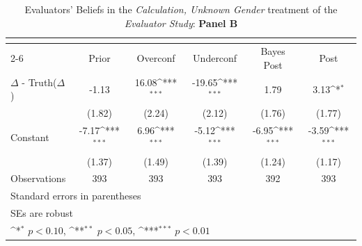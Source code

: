 \begin{table}[htbp]\centering
\def\sym#1{\ifmmode^{#1}\else\(^{#1}\)\fi}
\caption{Evaluators' Beliefs in the \textit{Calculation, Unknown Gender} treatment of the \textit{Evaluator Study}: \textbf{Panel B}}
\begin{tabular}{l*{5}{c}}
\hline\hline
                &\multicolumn{5}{c}{}                                                                          \\\cmidrule(lr){2-6}
                &\multicolumn{1}{c}{Prior}&\multicolumn{1}{c}{Overconf}&\multicolumn{1}{c}{Underconf}&\multicolumn{1}{c}{Bayes Post}&\multicolumn{1}{c}{Post}\\
\hline
$\Delta$ - Truth($\Delta$)&    -1.13         &    16.08\sym{***}&   -19.65\sym{***}&     1.79         &     3.13\sym{*}  \\
                &   (1.82)         &   (2.24)         &   (2.12)         &   (1.76)         &   (1.77)         \\
Constant        &    -7.17\sym{***}&     6.96\sym{***}&    -5.12\sym{***}&    -6.95\sym{***}&    -3.59\sym{***}\\
                &   (1.37)         &   (1.49)         &   (1.39)         &   (1.24)         &   (1.17)         \\
\hline
Observations    &      393         &      393         &      393         &      392         &      393         \\
\hline\hline
\multicolumn{6}{l}{\footnotesize Standard errors in parentheses}\\
\multicolumn{6}{l}{\footnotesize SEs are robust}\\
\multicolumn{6}{l}{\footnotesize \sym{*} \(p<0.10\), \sym{**} \(p<0.05\), \sym{***} \(p<0.01\)}\\
\end{tabular}
\end{table}
